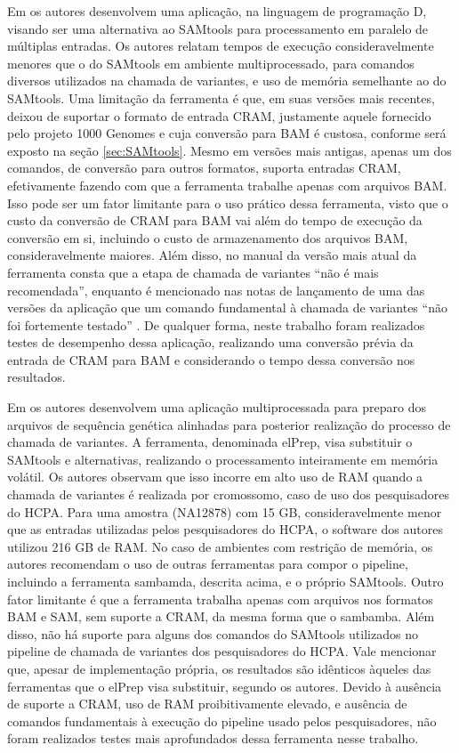 \documentclass[cic,tc]{iiufrgs}
\begin{document}
Em \cite{tarasov2015sambamba} os autores desenvolvem uma aplicação, na
linguagem de programação D, visando ser uma alternativa ao SAMtools para
processamento em paralelo de múltiplas entradas. Os autores relatam tempos de
execução consideravelmente menores que o do SAMtools em ambiente
multiprocessado, para comandos diversos utilizados na chamada de variantes, e
uso de memória semelhante ao do SAMtools. Uma limitação da ferramenta é que, em
suas versões mais recentes, deixou de suportar o formato de entrada CRAM,
justamente aquele fornecido pelo projeto 1000 Genomes e cuja conversão para BAM é
custosa, conforme será exposto na seção \ref{sec:SAMtools}. Mesmo em versões
mais antigas, apenas um dos comandos, de conversão para outros formatos,
suporta entradas CRAM, efetivamente fazendo com que a ferramenta trabalhe
apenas com arquivos BAM. Isso pode ser um fator limitante para o uso prático
dessa ferramenta, visto que o custo da conversão de CRAM para BAM vai além do
tempo de execução da conversão em si, incluindo o custo de armazenamento dos
arquivos BAM, consideravelmente maiores. Além disso, no manual da versão mais
atual da ferramenta consta que a etapa de chamada de variantes ``não é mais
recomendada'', enquanto é mencionado nas notas de lançamento de uma das versões
da aplicação que um comando fundamental à chamada de variantes ``não foi
fortemente testado'' \cite{manual2015sambamba}. De qualquer forma, neste
trabalho foram realizados testes de desempenho dessa aplicação, realizando uma
conversão prévia da entrada de CRAM para BAM e considerando o tempo dessa
conversão nos resultados.

Em \cite{herzeel2015elprep} os autores desenvolvem uma aplicação
multiprocessada para preparo dos arquivos de sequência genética alinhadas para
posterior realização do processo de chamada de variantes. A ferramenta,
denominada elPrep, visa substituir o SAMtools e alternativas, realizando o
processamento inteiramente em memória volátil. Os autores observam que isso
incorre em alto uso de RAM quando a chamada de variantes é realizada por
cromossomo, caso de uso dos pesquisadores do HCPA. Para uma amostra (NA12878)
com 15 GB, consideravelmente menor que as entradas utilizadas pelos
pesquisadores do HCPA, o software dos autores utilizou 216 GB de RAM. No caso de
ambientes com restrição de memória, os autores recomendam o uso de outras
ferramentas para compor o pipeline, incluindo a ferramenta sambamda, descrita
acima, e o próprio SAMtools. Outro fator limitante é que a ferramenta trabalha
apenas com arquivos nos formatos BAM e SAM, sem suporte a CRAM, da mesma forma
que o sambamba. Além disso, não há suporte para alguns dos comandos do
SAMtools utilizados no pipeline de chamada de variantes dos pesquisadores do
HCPA. Vale mencionar que, apesar de implementação própria, os resultados são
idênticos àqueles das ferramentas que o elPrep visa substituir, segundo os
autores. Devido à ausência de suporte a CRAM, uso de RAM proibitivamente
elevado, e ausência de comandos fundamentais à execução do pipeline usado pelos
pesquisadores, não foram realizados testes mais aprofundados dessa ferramenta
nesse trabalho.
\end{document}
